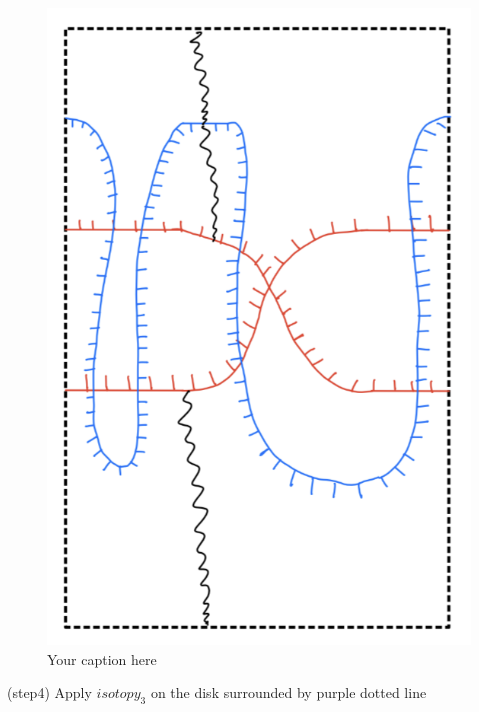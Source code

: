\begin{figure}[H] %
    \centering
    \includegraphics[scale = 0.95]{diagrams/lemma10/8.png} %
    \caption{Your caption here}
    \label{fig:your-label}
\end{figure}

(step4) Apply $isotopy_3$ on the disk surrounded by purple dotted line


